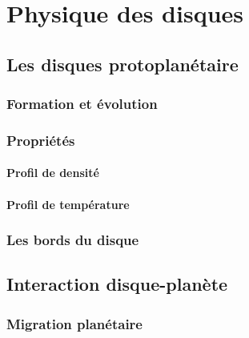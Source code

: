 \documentclass[logos,parttoc]{bordeaux-thesis}
\begin{document}




\chapter{Physique des disques}
\section{Les disques protoplanétaire}
\subsection{Formation et évolution}
\subsection{Propriétés}
\subsubsection{Profil de densité}
\subsubsection{Profil de température}

\subsection{Les bords du disque}

\section{Interaction disque-planète}
\subsection{Migration planétaire}
\end{document}
